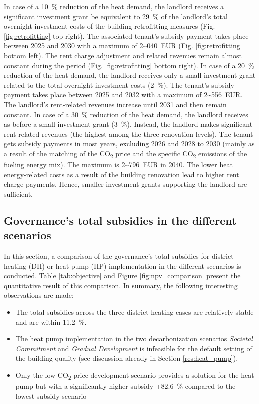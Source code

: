 In case of a \SI{10}{\%} reduction of the heat demand, the landlord receives a significant investment grant be equivalent to \SI{29}{\%} of the landlord's total overnight investment costs of the building retrofitting measures (Fig. \ref{fig:retrofitting} top right). The associated tenant's subsidy payment takes place between 2025 and 2030 with a maximum of \SI{2~040}{EUR} (Fig. \ref{fig:retrofitting} bottom left). The rent charge adjustment and related revenues remain almost constant during the period (Fig. \ref{fig:retrofitting} bottom right). In case of a \SI{20}{\%} reduction of the heat demand, the landlord receives only a small investment grant related to the total overnight investment costs (\SI{2}{\%}). The tenant's subsidy payment takes place between 2025 and 2032 with a maximum of \SI{2~556}{EUR}. The landlord's rent-related revenues increase until 2031 and then remain constant. In case of a \SI{30}{\%} reduction of the heat demand, the landlord receives as before a small investment grant (\SI{3}{\%}). Instead, the landlord makes significant rent-related revenues (the highest among the three renovation levels). The tenant gets subsidy payments in most years, excluding 2026 and 2028 to 2030 (mainly as a result of the matching of the CO\textsubscript{2} price and the specific CO\textsubscript{2} emissions of the fueling energy mix). The maximum is \SI{2~796}{EUR} in 2040. The lower heat energy-related costs as a result of the building renovation lead to higher rent charge payments. Hence, smaller investment grants supporting the landlord are sufficient. 

\subsection{Governance's total subsidies in the different scenarios}\label{res:overview}
In this section, a comparison of the governance's total subsidies for district heating (DH) or heat pump (HP) implementation in the different scenarios is conducted. Table \ref{tab:objective} and Figure \ref{fig:npv_comparison} present the quantitative result of this comparison. In summary, the following interesting observations are made:

\begin{itemize}
	\item The total subsidies across the three district heating cases are relatively stable and are within \SI{11.2}{\%}.
	\item The heat pump implementation in the two decarbonization scenarios \textit{Societal Commitment} and \textit{Gradual Development} is infeasible for the default setting of the building quality (see discussion already in Section \ref{res:heat_pump}).
	\item Only the low CO\textsubscript{2} price development scenario provides a solution for the heat pump but with a significantly higher subsidy +\SI{82.6}{\%} compared to the lowest subsidy scenario
\end{itemize}

